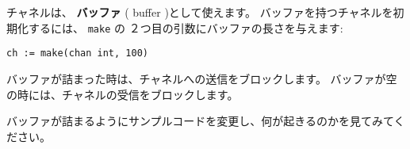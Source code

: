 チャネルは、 \textbf{バッファ} ( buffer )として使えます。
バッファを持つチャネルを初期化するには、 \texttt{make} の
２つ目の引数にバッファの長さを与えます:

\begin{lstlisting}[numbers=none]
ch := make(chan int, 100)
\end{lstlisting}
バッファが詰まった時は、チャネルへの送信をブロックします。
バッファが空の時には、チャネルの受信をブロックします。

バッファが詰まるようにサンプルコードを変更し、何が起きるのかを見てみてください。